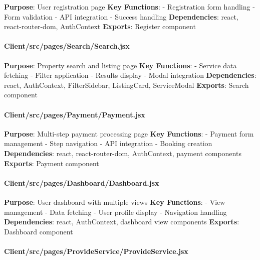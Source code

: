 \documentclass[12pt,a4paper]{article}
\begin{document}
\textbf{Purpose}: User registration page \textbf{Key Functions}: -
Registration form handling - Form validation - API integration - Success
handling \textbf{Dependencies}: react, react-router-dom, AuthContext
\textbf{Exports}: Register component

\hypertarget{clientsrcpagessearchsearch.jsx}{%
\paragraph{Client/src/pages/Search/Search.jsx}\label{clientsrcpagessearchsearch.jsx}}

\textbf{Purpose}: Property search and listing page \textbf{Key
Functions}: - Service data fetching - Filter application - Results
display - Modal integration \textbf{Dependencies}: react, AuthContext,
FilterSidebar, ListingCard, ServiceModal \textbf{Exports}: Search
component

\hypertarget{clientsrcpagespaymentpayment.jsx}{%
\paragraph{Client/src/pages/Payment/Payment.jsx}\label{clientsrcpagespaymentpayment.jsx}}

\textbf{Purpose}: Multi-step payment processing page \textbf{Key
Functions}: - Payment form management - Step navigation - API
integration - Booking creation \textbf{Dependencies}: react,
react-router-dom, AuthContext, payment components \textbf{Exports}:
Payment component

\hypertarget{clientsrcpagesdashboarddashboard.jsx}{%
\paragraph{Client/src/pages/Dashboard/Dashboard.jsx}\label{clientsrcpagesdashboarddashboard.jsx}}

\textbf{Purpose}: User dashboard with multiple views \textbf{Key
Functions}: - View management - Data fetching - User profile display -
Navigation handling \textbf{Dependencies}: react, AuthContext, dashboard
view components \textbf{Exports}: Dashboard component

\hypertarget{clientsrcpagesprovideserviceprovideservice.jsx}{%
\paragraph{Client/src/pages/ProvideService/ProvideService.jsx}\label{clientsrcpagesprovideserviceprovideservice.jsx}}
\end{document}
